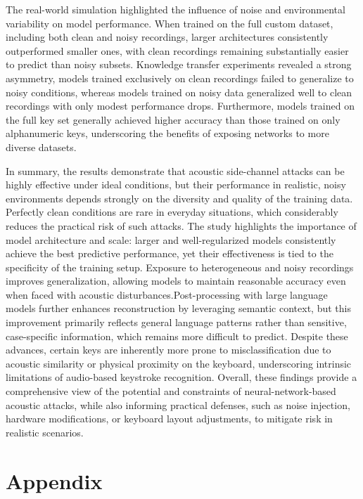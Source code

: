 \documentclass[a4paper,11pt,twoside]{report}
\theoremstyle{definition}
\begin{document}
The real-world simulation highlighted the influence of noise and environmental variability on model performance. When trained on the full custom dataset, including both clean and noisy recordings, larger architectures consistently outperformed smaller ones, with clean recordings remaining substantially easier to predict than noisy subsets. Knowledge transfer experiments revealed a strong asymmetry, models trained exclusively on clean recordings failed to generalize to noisy conditions, whereas models trained on noisy data generalized well to clean recordings with only modest performance drops. Furthermore, models trained on the full key set generally achieved higher accuracy than those trained on only alphanumeric keys, underscoring the benefits of exposing networks to more diverse datasets.

In summary, the results demonstrate that acoustic side-channel attacks can be highly effective under ideal conditions, but their performance in realistic, noisy environments depends strongly on the diversity and quality of the training data. Perfectly clean conditions are rare in everyday situations, which considerably reduces the practical risk of such attacks. The study highlights the importance of model architecture and scale: larger and well-regularized models consistently achieve the best predictive performance, yet their effectiveness is tied to the specificity of the training setup. Exposure to heterogeneous and noisy recordings improves generalization, allowing models to maintain reasonable accuracy even when faced with acoustic disturbances.Post-processing with large language models further enhances reconstruction by leveraging semantic context, but this improvement primarily reflects general language patterns rather than sensitive, case-specific information, which remains more difficult to predict. Despite these advances, certain keys are inherently more prone to misclassification due to acoustic similarity or physical proximity on the keyboard, underscoring intrinsic limitations of audio-based keystroke recognition. Overall, these findings provide a comprehensive view of the potential and constraints of neural-network-based acoustic attacks, while also informing practical defenses, such as noise injection, hardware modifications, or keyboard layout adjustments, to mitigate risk in realistic scenarios.

\printbibliography



\newpage

\section*{Appendix}
\end{document}
